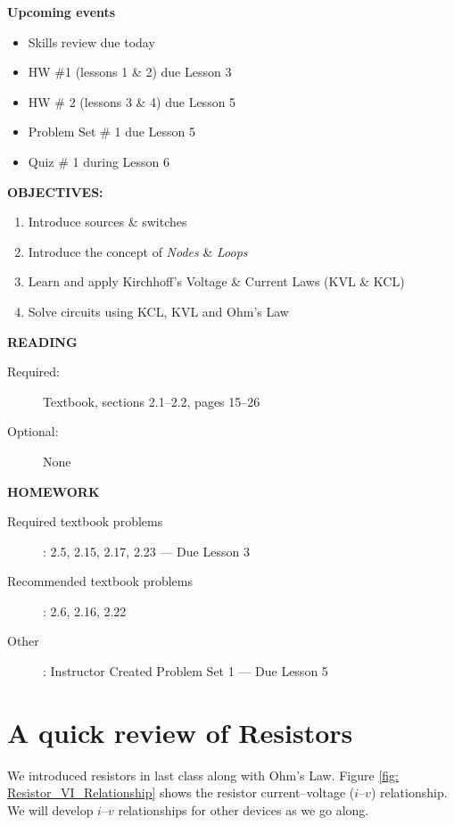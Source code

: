 \documentclass{handout}
\begin{document}
\maketitle

\textbf{Upcoming events}

\begin{itemize}
\item Skills review due today
\item HW \#1 (lessons 1 \& 2) due Lesson 3
\item HW \# 2 (lessons 3 \& 4) due Lesson 5
\item Problem Set \# 1 due Lesson 5
\item Quiz \# 1 during Lesson 6
\end{itemize}

\textbf{OBJECTIVES:}
\begin{enumerate}
\item Introduce sources \& switches
\item Introduce the concept of {\em Nodes} \& {\em Loops}
\item Learn and apply Kirchhoff's Voltage \& Current Laws (KVL \& KCL)
\item Solve circuits using KCL, KVL and Ohm's Law

\end{enumerate}

\textbf{READING}
\begin{description}
\item [Required:] Textbook, sections 2.1--2.2, pages 15--26
\item [Optional:]None
\end{description}

\textbf{HOMEWORK}
\begin{description}
\item [Required textbook problems]: 2.5, 2.15, 2.17, 2.23 --- Due Lesson 3
\item [Recommended textbook problems]: 2.6, 2.16, 2.22
\item[Other]: Instructor Created Problem Set 1 --- Due Lesson 5
\end{description}

\section{A quick review of Resistors}
We introduced resistors in last class along with Ohm's Law. Figure \ref{fig: Resistor_VI_Relationship} shows the resistor current--voltage ($i$--$v$) relationship.  We will develop $i$--$v$ relationships for other devices as we go along.
\end{document}
